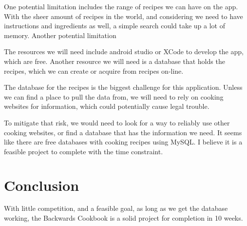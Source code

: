 \documentclass{article}
\begin{document}
One potential limitation includes the range of recipes we can have on the app. With the sheer amount of recipes in the world, and considering we need to have instructions and ingredients as well, a simple search could take up a lot of memory. Another potential limitation 

The resources we will need include android studio or XCode to develop the app, which are free. Another resource we will need is a database that holds the recipes, which we can create or acquire from recipes on-line. 

The database for the recipes is the biggest challenge for this application. Unless we can find a place to pull the data from, we will need to rely on cooking websites for information, which could potentially cause legal trouble. 

To mitigate that risk, we would need to look for a way to reliably use other cooking websites, or find a database that has the information we need. It seems like there are free databases with cooking recipes using MySQL. I believe it is a feasible project to complete with the time constraint. 

\section {Conclusion}

With little competition, and a feasible goal, as long as we get the database working, the Backwards Cookbook is a solid project for completion in 10 weeks. 
\end{document}
